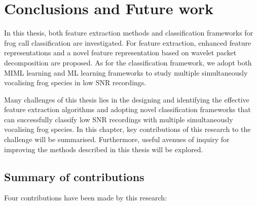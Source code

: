 
\chapter[Conclusions and Future work]{Conclusions and Future work}
\label{cha:cha8Conclusions}

In this thesis, both feature extraction methods and classification frameworks for frog call classification are investigated. For feature extraction, enhanced feature representations and a novel feature representation based on wavelet packet decomposition are proposed. As for the classification framework, we adopt both MIML learning and ML learning frameworks to study multiple simultaneously vocalising frog species in low SNR recordings. 

Many challenges of this thesis lies in the designing and identifying the effective feature extraction algorithms and adopting novel classification frameworks that can successfully classify low SNR recordings with multiple simultaneously vocalising frog species. 
In this chapter, key contributions of this research to the challenge will be summarised. Furthermore, useful avenues of inquiry for improving the methods described in this thesis will be explored.

\section{Summary of contributions}
	
Four contributions have	been made by this research:


